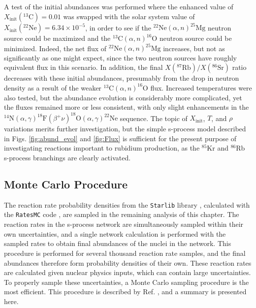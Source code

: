 A test of the initial abundances was performed where the enhanced value of $X_{\mathrm{init}}(^{13}\mathrm{C}) = 0.01$ was swapped with the solar system value of $X_{\mathrm{init}}(^{22}\mathrm{Ne}) = 6.34 \times 10^{-5}$, in order to see if the $^{22}\mathrm{Ne}(\alpha,n)^{25}\mathrm{Mg}$ neutron source could be maximized and the $^{13}\mathrm{C}(\alpha,n)^{16}\mathrm{O}$ neutron source could be minimized. Indeed, the net flux of $^{22}\mathrm{Ne}(\alpha,n)^{25}\mathrm{Mg}$ increases, but not as significantly as one might expect, since the two neutron sources have roughly equivalent flux in this scenario. In addition, the final $X(^{87}\mathrm{Rb})/X(^{86}\mathrm{Sr})$ ratio decreases with these initial abundances, presumably from the drop in neutron density as a result of the weaker $^{13}\mathrm{C}(\alpha,n)^{16}\mathrm{O}$ flux. Increased temperatures were also tested, but the abundance evolution is considerably more complicated, yet the fluxes remained more or less consistent, with only slight enhancements in the $^{14}\mathrm{N}(\alpha,\gamma)^{18}\mathrm{F}(\beta^{+}\nu)^{18}\mathrm{O}(\alpha,\gamma)^{22}\mathrm{Ne}$ sequence. The topic of $X_{\mathrm{init}}$, $T$, and $\rho$ variations merits further investigation, but the simple s-process model described in Figs. \ref{fig:abund_evol} and \ref{fig:Flux} is sufficient for the present purpose of investigating reactions important to rubidium production, as the $^{85}$Kr and $^{86}$Rb s-process branchings are clearly activated.

\subsection{Monte Carlo Procedure}



The reaction rate probability densities from the \texttt{Starlib} library \cite{Sallaska2013}, calculated with the \texttt{RatesMC} code \cite{Longland2010a,RatesMC}, are sampled in the remaining analysis of this chapter. The reaction rates in the s-process network are simultaneously sampled within their own uncertainties, and a single network calculation is performed with the sampled rates to obtain final abundances of the nuclei in the network. This procedure is performed for several thousand reaction rate samples, and the final abundances therefore form probability densities of their own. These reaction rates are calculated given nuclear physics inputs, which can contain large uncertainties. To properly sample these uncertainties, a Monte Carlo sampling procedure is the most efficient. This procedure is described by Ref. \cite{Longland2012}, and a summary is presented here.

